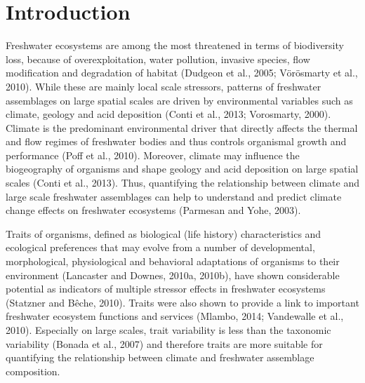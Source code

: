 \newpage

\section{Introduction}
\label{introduction}

Freshwater ecosystems are among the most threatened in terms of biodiversity loss, because of overexploitation, water pollution, invasive species, flow modification and degradation of habitat (Dudgeon et al., 2005; Vörösmarty et al., 2010). While these are mainly local scale stressors, patterns of freshwater assemblages on large spatial scales are driven by environmental variables such as climate, geology and acid deposition (Conti et al., 2013; Vorosmarty, 2000). Climate is the predominant environmental driver that directly affects the thermal and flow regimes of freshwater bodies and thus controls organismal growth and performance (Poff et al., 2010). Moreover, climate may influence the biogeography of organisms and shape geology and acid deposition on large spatial scales (Conti et al., 2013). Thus, quantifying the relationship between climate and large scale freshwater assemblages can help to understand and predict climate change effects on freshwater ecosystems (Parmesan and Yohe, 2003).

Traits of organisms, defined as biological (life history) characteristics and ecological preferences that may evolve from a number of developmental, morphological, physiological and behavioral adaptations of organisms to their environment (Lancaster and Downes, 2010a, 2010b), have shown considerable potential as indicators of multiple stressor effects in freshwater ecosystems (Statzner and Bêche, 2010). Traits were also shown to provide a link to important freshwater ecosystem functions and services (Mlambo, 2014; Vandewalle et al., 2010). Especially on large scales, trait variability is less than the taxonomic variability (Bonada et al., 2007) and therefore traits are more suitable for quantifying the relationship between climate and freshwater assemblage composition.

